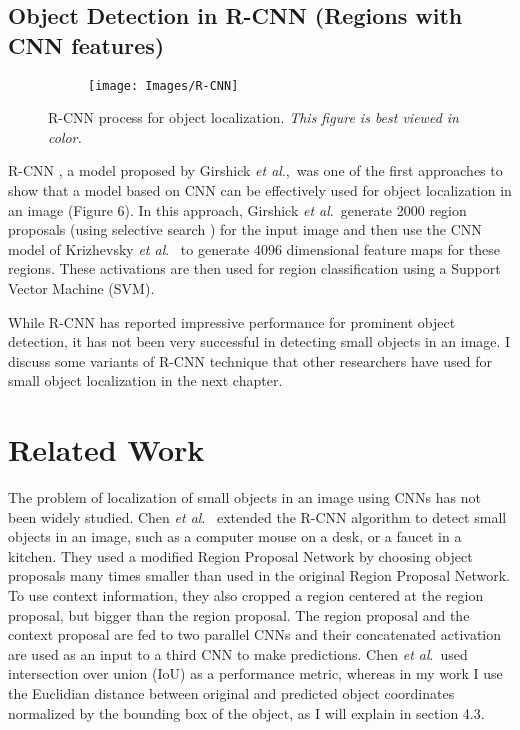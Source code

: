\documentclass [11pt,letterpaper ,twoside ,openany ]{report}
\begin{document}
     \section{Object Detection in R-CNN (Regions with CNN features)}

    \begin{figure}[h]
      \centering
      \begin{subfigure}[b]{0.70\linewidth}
        \texttt{[image: Images/R-CNN]}
      \end{subfigure}
      \caption{R-CNN \cite{girshick2014rich} process for object localization. \textit{This figure is best viewed in color.}}
      \label{fig:r-cnn}
    \end{figure}    

     R-CNN \cite{girshick2014rich}, a model proposed by Girshick \textit{et al}.,\ was one of the first approaches to show that a model based on CNN can be effectively used for object localization in an image (Figure 6). In this approach, Girshick \textit{et al}.\ generate 2000 region proposals (using selective search \cite{uijlings2013selective}) for the input image and then use the CNN model of Krizhevsky \textit{et al}.\ \cite{krizhevsky2012imagenet} to generate 4096 dimensional feature maps for these regions. These activations are then used for region classification using a Support Vector Machine (SVM).

     While R-CNN has reported impressive performance for prominent object detection, it has not been very successful in detecting small objects in an image. I discuss some variants of R-CNN technique that other researchers have used for small object localization \cite{chen2016r, eggert2017improving} in the next chapter.

    \chapter{Related Work}
    \doublespacing
    The problem of localization of small objects in an image using CNNs has not been widely studied. Chen \textit{et al}.\ \cite{chen2016r} extended the R-CNN algorithm to detect small objects in an image, such as a computer mouse on a desk, or a faucet in a kitchen. They used a modified Region Proposal Network \cite{ren2015faster} by choosing object proposals many times smaller than used in the original Region Proposal Network. To use context information, they also cropped a region centered at the region proposal, but bigger than the region proposal. The region proposal and the context proposal are fed to two parallel CNNs and their concatenated activation are used as an input to a third CNN to make predictions. Chen \textit{et al}.\ used intersection over union (IoU) as a performance metric, whereas in my work I use the Euclidian distance between original and predicted object coordinates normalized by the bounding box of the object, as I will explain in section 4.3. 
\end{document}
